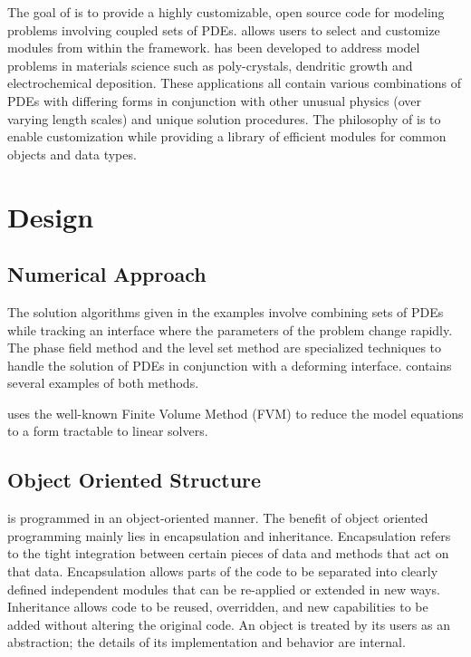 The goal of \FiPy{} is to provide a highly customizable, open source
code for modeling problems involving coupled sets of PDEs.  \FiPy{}
allows users to select and customize modules from within the
framework.  \FiPy{} has been developed to address model problems in
materials science such as poly-crystals, dendritic growth and
electrochemical deposition.  These applications all contain various
combinations of PDEs with differing forms in conjunction with other
unusual physics (over varying length scales) and unique solution
procedures.  The philosophy of \FiPy{} is to enable customization
while providing a library of efficient modules for common objects and
data types.

\section{Design}

\subsection{Numerical Approach}

The solution algorithms given in the \FiPy{} examples involve combining
sets of PDEs while tracking an interface where the parameters of the
problem change rapidly. The phase field method and the level set
method are specialized techniques to handle the solution of
PDEs in conjunction with a deforming interface. \FiPy{} contains
several examples of both methods.

\FiPy{} uses the well-known Finite Volume Method (FVM) to reduce the
model equations to a form tractable to linear solvers.

\subsection{Object Oriented Structure}

\FiPy{} is programmed in an object-oriented manner.  The benefit of
object oriented programming mainly lies in encapsulation and
inheritance.  Encapsulation refers to the tight integration between
certain pieces of data and methods that act on that data.
Encapsulation allows parts of the code to be separated into clearly
defined independent modules that can be re-applied or extended in new
ways.  Inheritance allows code to be reused, overridden, and new
capabilities to be added without altering the original code. An object
is treated by its users as an abstraction; the details of its
implementation and behavior are internal.

